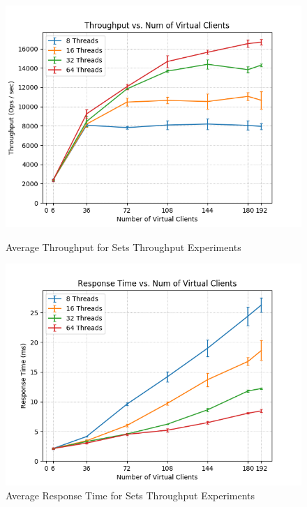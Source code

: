 \documentclass[11pt,a4paper]{article}
\begin{document}
\begin{figure}[H]
	\captionsetup{font=scriptsize,labelfont=scriptsize,justification=centering}
	\centering
	\begin{minipage}{0.5\textwidth}
		\centering
		\includegraphics[scale=0.5]{images/4_set_tps_tps.png}
		\caption{Average Throughput for Sets Throughput Experiments}		
	\end{minipage}\hfill
	\begin{minipage}{0.5\textwidth}
		\centering
		\includegraphics[scale=0.5]{images/4_set_tps_rt.png}
		\caption{Average Response Time for Sets Throughput Experiments}
	\end{minipage}
\end{figure}
\end{document}

